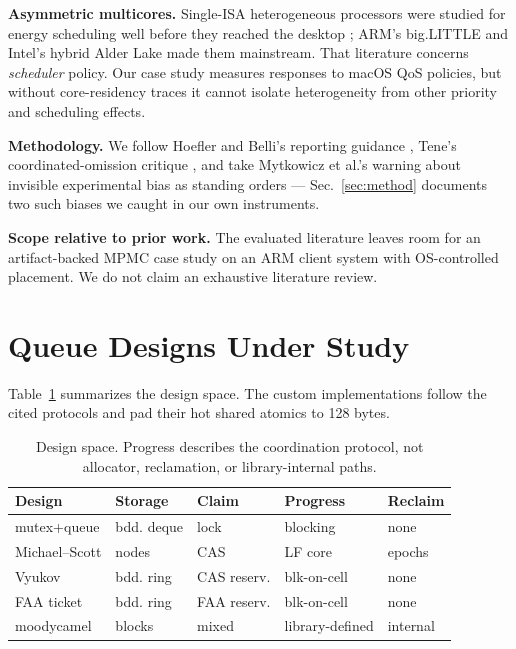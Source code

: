 \documentclass[conference]{IEEEtran}
\begin{document}
\textbf{Asymmetric multicores.} Single-ISA heterogeneous processors were
studied for energy scheduling well before they reached the desktop
\cite{fedorova2009}; ARM's big.LITTLE \cite{greenhalgh2011} and Intel's hybrid
Alder Lake \cite{rotem2022} made them mainstream. That literature concerns
\emph{scheduler} policy. Our case study measures responses to macOS QoS
policies, but without core-residency traces it cannot isolate heterogeneity
from other priority and scheduling effects.

\textbf{Methodology.} We follow Hoefler and Belli's reporting guidance
\cite{hoefler2015}, Tene's coordinated-omission critique \cite{tene}, and take
Mytkowicz et al.'s warning about invisible experimental bias
\cite{mytkowicz2009} as standing orders --- Sec.~\ref{sec:method} documents
two such biases we caught in our own instruments.

\textbf{Scope relative to prior work.} The evaluated literature leaves room
for an artifact-backed MPMC case study on an ARM client system with
OS-controlled placement. We do not claim an exhaustive literature review.

\section{Queue Designs Under Study}
\label{sec:designs}
Table~\ref{tab:designs} summarizes the design space. The custom implementations
follow the cited protocols and pad their hot shared atomics to 128 bytes.

\begin{table}[t]
\caption{Design space. Progress describes the coordination protocol, not
allocator, reclamation, or library-internal paths.}
\label{tab:designs}
\centering
\footnotesize
\setlength{\tabcolsep}{2.5pt}
\begin{tabular}{@{}lllll@{}}
\toprule
Design & Storage & Claim & Progress & Reclaim \\
\midrule
mutex+queue & bdd. deque & lock & blocking & none \\
Michael--Scott & nodes & CAS & LF core & epochs \\
Vyukov & bdd. ring & CAS reserv. & blk-on-cell & none \\
FAA ticket & bdd. ring & FAA reserv. & blk-on-cell & none \\
moodycamel & blocks & mixed & library-defined & internal \\
\bottomrule
\end{tabular}
\end{table}
\end{document}
